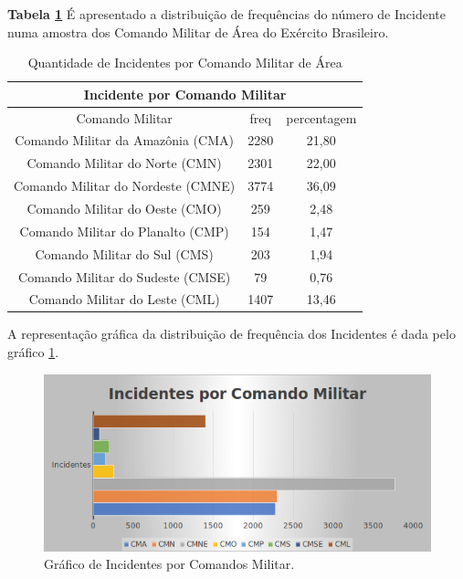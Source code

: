 \textbf{Tabela \ref{QuantidadeIncidentes}} É apresentado a distribuição de frequências do número de Incidente numa amostra dos Comando Militar de Área do Exército Brasileiro. 
\begin{table}[H]
\centering
\begin{tabular}{|c | c| c|} 
 \multicolumn{3}{c}{Incidente por Comando Militar}\\ \hline
  Comando Militar & freq   & percentagem \\ [0.5ex] 
 \hline
 Comando Militar da Amazônia (CMA) & 2280 & 21,80\\ 
 \hline
 Comando Militar do Norte (CMN) &  2301 & 22,00\\
 \hline
 Comando Militar do Nordeste (CMNE) &  3774 & 36,09\\
 \hline
 Comando Militar do Oeste (CMO) & 259 & 2,48\\
 \hline
 Comando Militar do Planalto (CMP) &  154 & 1,47\\
 \hline
 Comando Militar do Sul (CMS) &  203 & 1,94\\
 \hline
 Comando Militar do Sudeste (CMSE) &  79 & 0,76\\
 \hline
 Comando Militar do Leste (CML) &  1407 & 13,46\\ [1ex] 
 \hline
\end{tabular}
\caption{Quantidade de Incidentes por Comando Militar de Área}
\label{QuantidadeIncidentes}
\end{table}

A representação gráfica da distribuição de frequência dos Incidentes é dada pelo gráfico \ref{figuraIncidentes}.
\begin{figure}[H]
        \centering
        \includegraphics[width=1\textwidth]{Figuras/qtde_incidentes.png}
        \caption{Gráfico de Incidentes por Comandos Militar.}
        \label{figuraIncidentes}
\end{figure}

